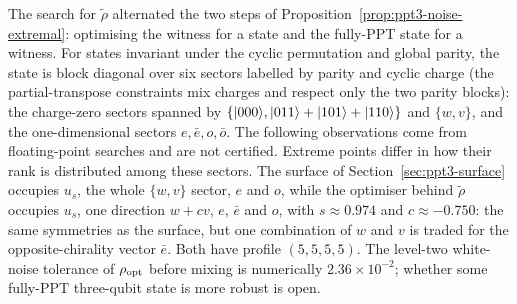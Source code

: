 \begin{remark}\label{rem:ppt3-robust-structure}
The search for $\tilde\rho$ alternated the two steps of Proposition~\ref{prop:ppt3-noise-extremal}:
optimising the witness for a state and the fully-PPT state for a witness. For states invariant under the cyclic permutation and global parity, the
state is block diagonal over six sectors labelled by parity and cyclic charge (the partial-transpose constraints mix
charges and respect only the two parity blocks): the charge-zero sectors spanned by
$\{\lvert000\rangle,\lvert011\rangle+\lvert101\rangle+\lvert110\rangle\}$ and $\{w,v\}$, and the one-dimensional sectors $e,\bar e,o,\bar o$.
The following observations come from floating-point searches and are not certified. Extreme points differ in how their
rank is distributed among these sectors. The surface of Section~\ref{sec:ppt3-surface}
occupies $u_s$, the whole $\{w,v\}$ sector, $e$ and $o$, while the optimiser behind $\tilde\rho$ occupies $u_s$, one
direction $w+cv$, $e$, $\bar e$ and $o$, with $s\approx0.974$ and $c\approx-0.750$: the same symmetries as the surface,
but one combination of $w$ and $v$ is traded for the opposite-chirality vector $\bar e$. Both have profile $(5,5,5,5)$.
The level-two white-noise tolerance of $\rho_{\rm opt}$ before mixing is numerically $2.36\times10^{-2}$; whether some fully-PPT
three-qubit state is more robust is open.
\end{remark}
